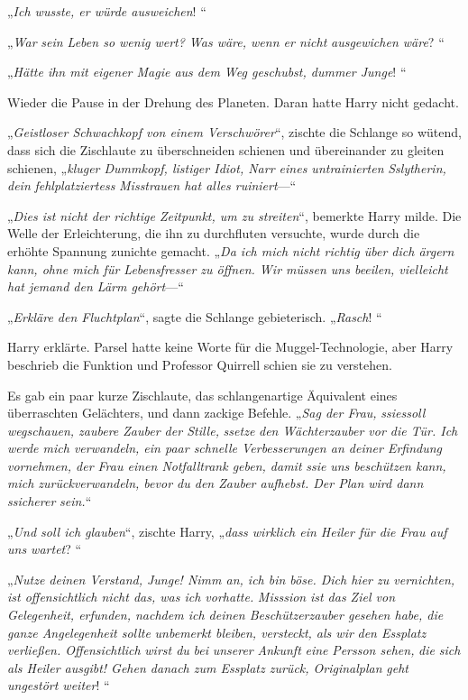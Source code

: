 {„\emph{Ich wusste, er würde ausweichen}! “

„\emph{War} \emph{sein Leben so wenig wert? Was wäre, wenn er nicht} \emph{ausgewichen wäre}? “

„\emph{Hätte ihn mit eigener Magie aus dem Weg geschubst, dummer Junge}! “

Wieder die Pause in der Drehung des Planeten. Daran hatte Harry nicht gedacht.

„\emph{Geistloser Schwachkopf von einem Verschwörer}“, zischte die Schlange so wütend, dass sich die Zischlaute zu überschneiden schienen und übereinander zu gleiten schienen, „\emph{kluger Dummkopf, listiger Idiot, Narr eines untrainierten} \emph{Sslytherin, dein} \emph{fehlplatziertess} \emph{Misstrauen hat alles ruiniert}—“

„\emph{Dies ist nicht der richtige Zeitpunkt, um zu streiten}“, bemerkte Harry milde. Die Welle der Erleichterung, die ihn zu durchfluten versuchte, wurde durch die erhöhte Spannung zunichte gemacht. „\emph{Da ich mich nicht richtig über dich ärgern kann, ohne mich für Lebensfresser zu öffnen. Wir müssen uns beeilen, vielleicht hat jemand den Lärm gehört}—“

„\emph{Erkläre den Fluchtplan}“, sagte die Schlange gebieterisch. „\emph{Rasch}! “

Harry erklärte. Parsel hatte keine Worte für die Muggel-Technologie, aber Harry beschrieb die Funktion und Professor Quirrell schien sie zu verstehen.

Es gab ein paar kurze Zischlaute, das schlangenartige Äquivalent eines überraschten Gelächters, und dann zackige Befehle. „\emph{Sag der Frau,} \emph{ssiessoll} \emph{wegschauen, zaubere Zauber der Stille,} \emph{ssetze} \emph{den Wächterzauber vor die Tür. Ich werde mich verwandeln, ein paar schnelle Verbesserungen an deiner Erfindung vornehmen, der Frau einen Notfalltrank geben, damit} \emph{ssie} \emph{uns beschützen kann, mich zurückverwandeln, bevor du den Zauber aufhebst. Der Plan wird dann} \emph{ssicherer} \emph{sein.}“

„\emph{Und soll ich glauben}“, zischte Harry, „\emph{dass wirklich ein Heiler für die Frau auf uns wartet}? “

„\emph{Nutze deinen Verstand, Junge! Nimm an, ich bin böse. Dich hier zu vernichten, ist offensichtlich nicht das, was ich vorhatte.} \emph{Misssion} \emph{ist das Ziel von Gelegenheit, erfunden, nachdem ich deinen Beschützerzauber gesehen habe, die ganze Angelegenheit sollte} \emph{unbemerkt bleiben, versteckt, als wir} \emph{den Essplatz verließen. Offensichtlich} \emph{wirst du} \emph{bei} \emph{unserer} \emph{Ankunft} \emph{eine} \emph{Persson sehen,} \emph{die} \emph{sich als Heiler ausgibt! Gehen danach zum Essplatz zurück, Originalplan} \emph{geht} \emph{ungestört weiter}! “

}
